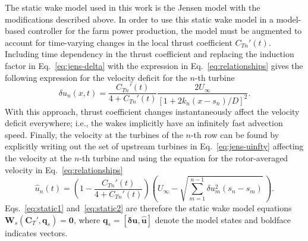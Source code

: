 The static wake model used in this work is the Jensen model with the modifications described above. In order to use this static wake model in a model-based controller for the farm power production, the model must be augmented to account for time-varying changes in the local thrust coefficient $C_{Tn}'(t)$. Including time dependency in the thrust coefficient and replacing the induction factor in Eq.~\eqref{eq:jens-delta} with the expression in Eq.~\eqref{eq:relationships} gives the following expression for the velocity deficit for the $n$-th turbine 
\begin{equation}
\label{eq:static1}
\delta u_n(x,t)  = \frac{C_{Tn}'(t)}{4 + C_{Tn}'(t)}\frac{2 U_\infty}{\left[1 + 2k_n (x - s_n)/D\right]^2}.
\end{equation}
With this approach, thrust coefficient changes instantaneously affect the velocity deficit everywhere; i.e., the wakes implicitly have an infinitely fast advection speed. Finally, the velocity at the turbines of the $n$-th row can be found by explicitly writing out the set of upstream turbines in Eq.~\eqref{eq:jens-uinfty} affecting the velocity at the $n$-th turbine and using the equation for the rotor-averaged velocity in Eq.~\eqref{eq:relationships}
\begin{equation}
\label{eq:static2}
\hat{u}_n(t) = \left(1- \frac{C_{Tn}'(t)}{4 + C_{Tn}'(t)}\right)\left( U_\infty - \sqrt{  \sum_{m=1}^{n-1} \delta u_m^2(s_n-s_m) } \, \right).
\end{equation}
Eqs.~\eqref{eq:static1} and~\eqref{eq:static2} are therefore the static wake model equations $\mathbf{W}_s(\mathbf{C}_{T}', \mathbf{q}_s) = \mathbf{0}$, where $\mathbf{q}_s = [\boldsymbol \delta \mathbf{u}, \mathbf{\hat{u}}]$ denote the model states and boldface indicates vectors. 

